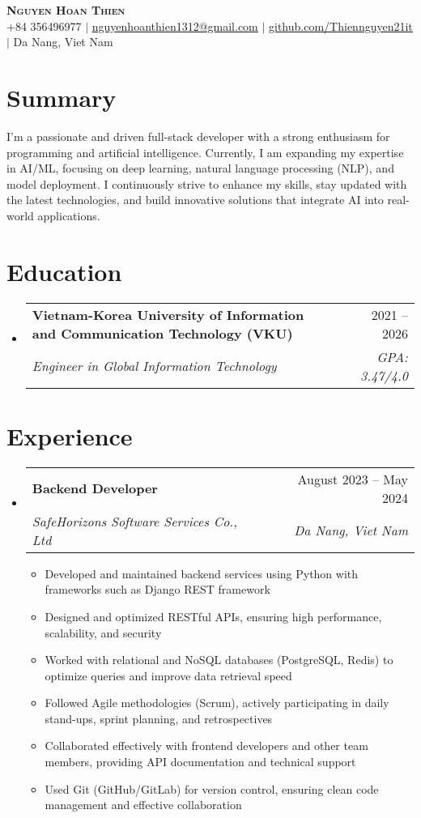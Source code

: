 \documentclass[letterpaper,11pt]{article}
\makeatletter
\newcommand{\resumeItem}[1]{
  \item\small{
    {#1 \vspace{-2pt}}
  }
}
\newcommand{\resumeSubheading}[4]{
  \vspace{-2pt}\item
    \begin{tabular*}{0.97\textwidth}[t]{l@{\extracolsep{\fill}}r}
      \textbf{#1} & #2 \\
      \textit{\small#3} & \textit{\small #4} \\
    \end{tabular*}\vspace{-7pt}
}
\newcommand{\resumeSubHeadingListStart}{\begin{itemize}[leftmargin=0.15in, label={}]}
\newcommand{\resumeSubHeadingListEnd}{\end{itemize}}
\newcommand{\resumeItemListStart}{\begin{itemize}}
\newcommand{\resumeItemListEnd}{\end{itemize}\vspace{-5pt}}
\makeatother
\begin{document}
\begin{center}
    \textbf{\Huge \scshape Nguyen Hoan Thien} \\ \vspace{1pt}
    \small +84 356496977 $|$ \href{mailto:nguyenhoanthien1312@gmail.com}{\underline{nguyenhoanthien1312@gmail.com}} $|$ 
    \href{https://github.com/Thiennguyen21it}{\underline{github.com/Thiennguyen21it}} $|$
    Da Nang, Viet Nam
\end{center}

\section{Summary}
I'm a passionate and driven full-stack developer with a strong enthusiasm for programming and artificial intelligence. Currently, I am expanding my expertise in AI/ML, focusing on deep learning, natural language processing (NLP), and model deployment. I continuously strive to enhance my skills, stay updated with the latest technologies, and build innovative solutions that integrate AI into real-world applications.

\section{Education}
  \resumeSubHeadingListStart
    \resumeSubheading
      {Vietnam-Korea University of Information and Communication Technology (VKU)}{2021 -- 2026}
      {Engineer in Global Information Technology}{GPA: 3.47/4.0}
  \resumeSubHeadingListEnd

\section{Experience}
  \resumeSubHeadingListStart
    \resumeSubheading
      {Backend Developer}{August 2023 -- May 2024}
      {SafeHorizons Software Services Co., Ltd}{Da Nang, Viet Nam}
      \resumeItemListStart
        \resumeItem{Developed and maintained backend services using Python with frameworks such as Django REST framework}
        \resumeItem{Designed and optimized RESTful APIs, ensuring high performance, scalability, and security}
        \resumeItem{Worked with relational and NoSQL databases (PostgreSQL, Redis) to optimize queries and improve data retrieval speed}
        \resumeItem{Followed Agile methodologies (Scrum), actively participating in daily stand-ups, sprint planning, and retrospectives}
        \resumeItem{Collaborated effectively with frontend developers and other team members, providing API documentation and technical support}
        \resumeItem{Used Git (GitHub/GitLab) for version control, ensuring clean code management and effective collaboration}
      \resumeItemListEnd
  \resumeSubHeadingListEnd
\end{document}
